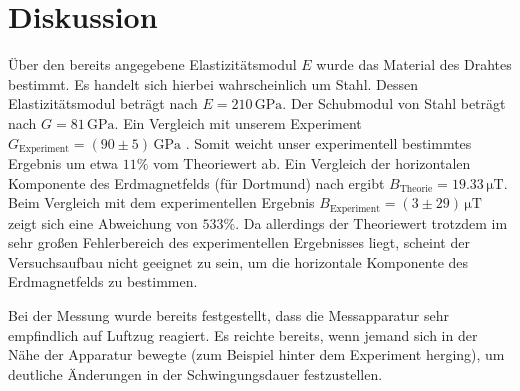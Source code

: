 \section{Diskussion}
\label{sec:Diskussion}
Über den bereits angegebene Elastizitätsmodul $E$ wurde das Material des Drahtes bestimmt.
Es handelt sich hierbei wahrscheinlich um Stahl. Dessen Elastizitätsmodul beträgt nach \cite{stahlharteJungs} $E=210 \,\si{\giga\pascal}$.
Der Schubmodul von Stahl beträgt nach \cite{stahlharteJungs} $G=81 \,\si{\giga\pascal}$. Ein Vergleich mit unserem Experiment $G_{\mathrm{Experiment}}=(90 \pm 5) \,\si{\giga\pascal}$ .
Somit weicht unser experimentell bestimmtes Ergebnis um etwa $11\%$ vom Theoriewert ab.
Ein Vergleich der horizontalen Komponente des Erdmagnetfelds (für Dortmund) nach \cite{Potsdam} ergibt $B_{\mathrm{Theorie}}=19.33 \,\si{\micro\tesla}$.
Beim Vergleich mit dem experimentellen Ergebnis $B_{\mathrm{Experiment}}=(3\pm29)\,\si{\micro\tesla}$ zeigt sich eine Abweichung von $533\%$. Da allerdings der Theoriewert trotzdem im sehr großen Fehlerbereich des experimentellen
Ergebnisses liegt, scheint der Versuchsaufbau nicht geeignet zu sein, um die horizontale Komponente des Erdmagnetfelds zu bestimmen.

Bei der Messung wurde bereits festgestellt, dass die Messapparatur sehr empfindlich auf Luftzug reagiert. Es reichte bereits,
wenn jemand sich in der Nähe der Apparatur bewegte (zum Beispiel hinter dem Experiment herging), um deutliche Änderungen in der Schwingungsdauer festzustellen.
